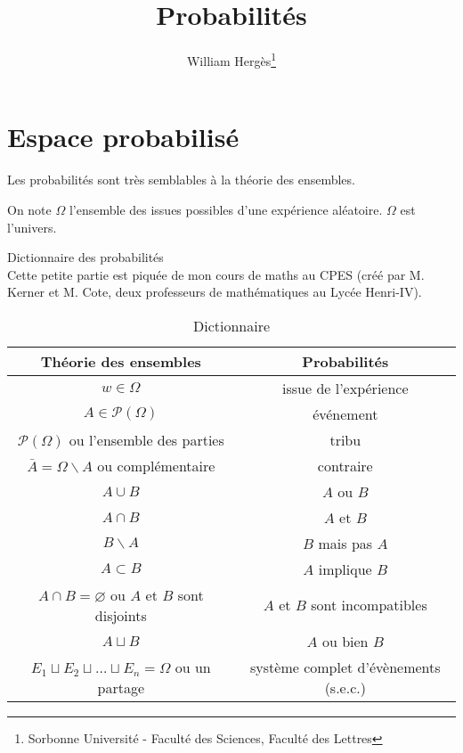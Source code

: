 \documentclass[a4paper, titlepage]{article}
\title{Probabilités}
\author{William Hergès\thanks{Sorbonne Université - Faculté des Sciences, Faculté des Lettres}}
\newenvironment{lititle}%
{\vspace{7mm}\LobsterTwo \large}%
{\\}
\begin{document}
	\maketitle
	\tableofcontents
	\newpage
	\section{Espace probabilisé}
	Les probabilités sont très semblables à la théorie des ensembles.
	\begin{defn}
		On note $\Omega$ l'ensemble des issues possibles d'une expérience aléatoire. $\Omega$ est l'univers.
	\end{defn}

	\begin{lititle}
		Dictionnaire des probabilités
	\end{lititle}
	Cette petite partie est piquée de mon cours de maths au CPES (créé par M. Kerner et M. Cote, deux professeurs de mathématiques au Lycée Henri-IV).
	\begin{table}[htpb]
		\centering
		\caption{Dictionnaire}
		\label{tab:dico-proba}
		\begin{tabular}{|c|c|}
			\hline
			Théorie des ensembles & Probabilités \\
			\hline
			$w\in\Omega$ & issue de l'expérience \\
			$A\in\mathcal{P}(\Omega)$ & événement \\
			$\mathcal{P}(\Omega)$ ou l'ensemble des parties & tribu \\
			$\bar A = \Omega\backslash A$ ou complémentaire & contraire \\
			$A\cup B$ & $A$ ou $B$ \\
			$A\cap B$ & $A$ et $B$ \\
			$B\backslash A$ & $B$ mais pas $A$\\
			$A\subset B$ & $A$ implique $B$ \\
			$A\cap B = \varnothing$ ou $A$ et $B$ sont disjoints & $A$ et $B$ sont incompatibles \\
			$A\sqcup B$ & $A$ ou bien $B$ \\
			$E_1\sqcup E_2\sqcup\ldots\sqcup E_n = \Omega$ ou un partage & système complet d'évènements (s.e.c.)\\
			\hline
		\end{tabular}
	\end{table}
\end{document}
